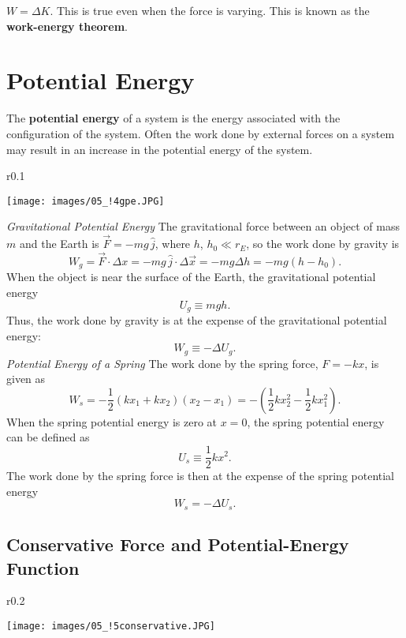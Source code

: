 \documentclass[11pt,a4paper]{report}
\begin{document}
\smallskip

\noindent
$W = \Delta{K}$. This is true even when the force is varying. This is known as the \textbf{work-energy theorem}.

\section{Potential Energy}
The \textbf{potential energy} of a system is the energy associated with the configuration of the system. Often the work done by external forces on a system may result in an increase in the potential energy of the system.

\begin{wrapfigure}{r}{0.1\textwidth}
\vspace{-23pt}
\begin{center}
\texttt{[image: images/05\_!4gpe.JPG]}
\end{center}
\vspace{-20pt}
\end{wrapfigure}

\smallskip

\noindent
\textit{Gravitational Potential Energy} The gravitational force between an object of mass $m$ and the Earth is $\vec{F} = -mg\,\hat{j}$, where $h$, $h_0 \ll r_E$, so the work done by gravity is $$W_g = \vec{F} \cdot \Delta{x} = -mg\,\hat{j} \cdot \Delta{\vec{x}} = -mg \Delta{h} = -mg \left(h - h_0\right).$$
When the object is near the surface of the Earth, the gravitational potential energy $$U_g \equiv mgh.$$
Thus, the work done by gravity is at the expense of the gravitational potential energy: $$W_g \equiv -\Delta{U_g}.$$
\textit{Potential Energy of a Spring} The work done by the spring force, $F = -kx$, is given as $$W_s = -\frac{1}{2} \left(kx_1 + kx_2\right)\left(x_2 - x_1\right) = -\left(\frac{1}{2} kx_2^2 - \frac{1}{2} kx_1^2\right).$$
When the spring potential energy is zero at $x = 0$, the spring potential energy can be defined as $$U_s \equiv \frac{1}{2} kx^2.$$
The work done by the spring force is then at the expense of the spring potential energy $$W_s = -\Delta{U_s}.$$

\subsection{Conservative Force and Potential-Energy Function}

\begin{wrapfigure}{r}{0.2\textwidth}
\vspace{-20pt}
\begin{center}
\texttt{[image: images/05\_!5conservative.JPG]}
\end{center}
\vspace{-20pt}
\end{wrapfigure}
\end{document}
